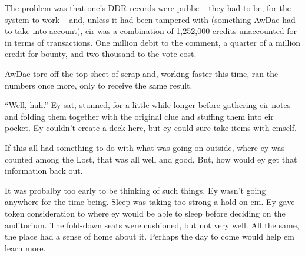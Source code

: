 The problem was that one's DDR records were public -- they had to be, for the system to work -- and, unless it had been tampered with (something AwDae had to take into account), eir was a combination of 1,252,000 credits unaccounted for in terms of transactions.  One million debit to the comment, a quarter of a million credit for bounty, and two thousand to the vote cost.

AwDae tore off the top sheet of scrap and, working faster this time, ran the numbers once more, only to receive the same result.

``Well, huh.''  Ey sat, stunned, for a little while longer before gathering eir notes and folding them together with the original clue and stuffing them into eir pocket.  Ey couldn't create a deck here, but ey could sure take items with emself.

If this all had something to do with what was going on outside, where ey was counted among the Lost, that was all well and good.  But, how would ey get that information back out.

It was probalby too early to be thinking of such things.  Ey wasn't going anywhere for the time being.  Sleep was taking too strong a hold on em.  Ey gave token consideration to where ey would be able to sleep before deciding on the auditorium.  The fold-down seats were cushioned, but not very well.  All the same, the place had a sense of home about it.  Perhaps the day to come would help em learn more.
